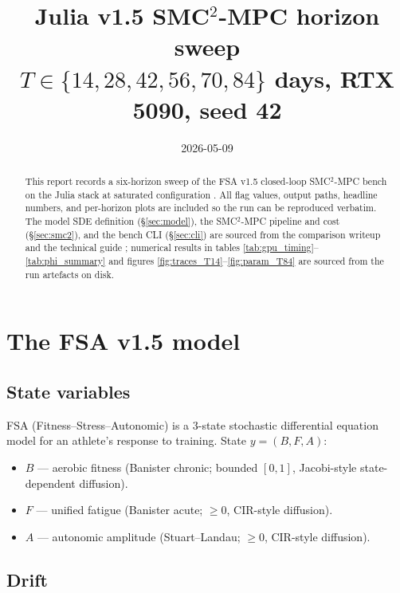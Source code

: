 \documentclass[11pt,a4paper]{article}
\title{Julia v1.5 SMC$^2$-MPC horizon sweep \\
       \large $T \in \{14, 28, 42, 56, 70, 84\}$ days, RTX 5090, seed 42}
\author{}
\date{2026-05-09}
\begin{document}
\maketitle

\begin{abstract}
This report records a six-horizon sweep of the FSA v1.5 closed-loop
SMC$^2$-MPC bench on the Julia stack at saturated configuration
\cite{techguide}. All flag values, output paths, headline numbers,
and per-horizon plots are included so the run can be reproduced
verbatim. The model SDE definition (\S\ref{sec:model}), the
SMC$^2$-MPC pipeline and cost (\S\ref{sec:smc2}), and the bench CLI
(\S\ref{sec:cli}) are sourced from the comparison writeup
\cite{writeup} and the technical guide \cite{techguide}; numerical
results in tables \ref{tab:gpu_timing}--\ref{tab:phi_summary} and
figures \ref{fig:traces_T14}--\ref{fig:param_T84} are sourced from
the run artefacts on disk.
\end{abstract}

\tableofcontents
\clearpage


\section{The FSA v1.5 model}
\label{sec:model}

\subsection{State variables}

FSA (Fitness--Stress--Autonomic) is a 3-state stochastic differential
equation model for an athlete's response to training. State
$y = (B, F, A)$:

\begin{itemize}[itemsep=2pt]
  \item $B$ --- aerobic fitness (Banister chronic; bounded $[0, 1]$,
        Jacobi-style state-dependent diffusion).
  \item $F$ --- unified fatigue (Banister acute; $\geq 0$, CIR-style
        diffusion).
  \item $A$ --- autonomic amplitude (Stuart--Landau; $\geq 0$, CIR-style
        diffusion).
\end{itemize}

\subsection{Drift}
\end{document}

